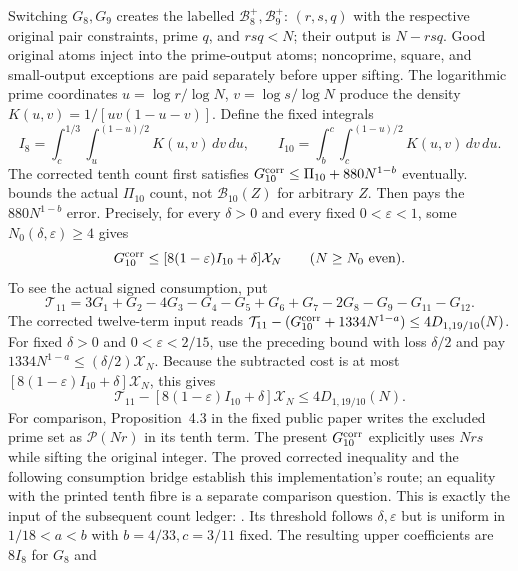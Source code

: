 Switching $G_8,G_9$ creates the labelled $\mathcal B_8^+,\mathcal B_9^+$:
$(r,s,q)$ with the respective original pair constraints, prime $q$,
and $rsq<N$; their output is $N-rsq$.
Good original atoms inject into the prime-output atoms; noncoprime,
square, and small-output exceptions are paid separately before upper sifting.
The logarithmic prime coordinates $u=\log r/\log N$, $v=\log s/\log N$
produce the density $K(u,v)=1/[uv(1-u-v)]$.
Define the fixed integrals
\[
 I_8=\int_c^{1/3}\int_u^{(1-u)/2}K(u,v)\,dv\,du,\qquad
 I_{10}=\int_b^c\int_c^{(1-u)/2}K(u,v)\,dv\,du.
\]
The corrected tenth count first satisfies
$G_{10}^{\rm corr}\le\Pi_{10}+880N^{1-b}$ eventually.
bounds the actual $\Pi_{10}$ count, not $\mathcal B_{10}(Z)$ for arbitrary $Z$.
Then 
pays the $880N^{1-b}$ error.  Precisely, for every $\delta>0$ and every
fixed $0<\varepsilon<1$, some $N_0(\delta,\varepsilon)\ge4$ gives
\[
 G_{10}^{\rm corr}\le[8(1-\varepsilon)I_{10}+\delta]\mathcal X_N
 \qquad(N\ge N_0\text{ even}).
\]
To see the actual signed consumption, put
\[
 \mathcal T_{11}=3G_1+G_2-4G_3-G_4-G_5+G_6+G_7
                    -2G_8-G_9-G_{11}-G_{12}.
\]
The corrected twelve-term input reads
$\mathcal T_{11}-(G_{10}^{\rm corr}+1334N^{1-a})\le4D_{1,19/10}(N)$.
For fixed $\delta>0$ and $0<\varepsilon<2/15$, use the preceding bound
with loss $\delta/2$ and pay $1334N^{1-a}\le(\delta/2)\mathcal X_N$.
Because the subtracted cost is at most
$[8(1-\varepsilon)I_{10}+\delta]\mathcal X_N$, this gives
\[
 \mathcal T_{11}-[8(1-\varepsilon)I_{10}+\delta]\mathcal X_N
 \le4D_{1,19/10}(N).
\]
For comparison, Proposition~4.3 in the fixed public paper writes the excluded
prime set as $\mathscr P(Nr)$ in its tenth term. The present
$G_{10}^{\rm corr}$ explicitly uses $Nrs$ while sifting the original integer.
The proved corrected inequality and the following consumption bridge establish
this implementation's route; an equality with the printed tenth fibre is a
separate comparison question.
This is exactly the input of the subsequent count ledger:
.
Its threshold follows $\delta,\varepsilon$ but is uniform in
$1/18<a<b$ with $b=4/33,c=3/11$ fixed.
The resulting upper coefficients are $8I_8$ for $G_8$ and
